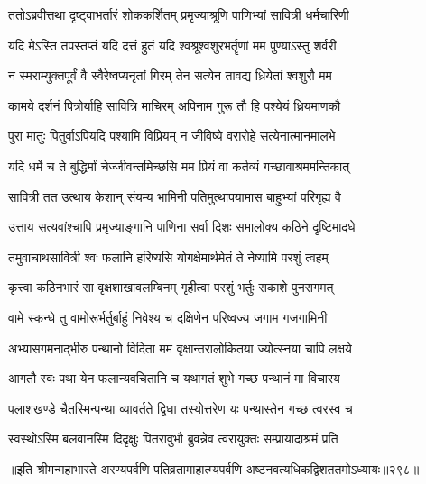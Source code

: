 \begin{center}
\twolineshloka
{ततोऽब्रवीत्तथा दृष्ट्वाभर्तारं शोककर्शितम्}
{प्रमृज्याश्रूणि पाणिभ्यां सावित्री धर्मचारिणी}


\twolineshloka
{यदि मेऽस्ति तपस्तप्तं यदि दत्तं हुतं यदि}
{श्वश्रूश्वशुरभर्तॄणां मम पुण्याऽस्तु शर्वरी}


\twolineshloka
{न स्मराम्युक्तपूर्वं वै स्वैरेष्वप्यनृतां गिरम्}
{तेन सत्येन तावद्य ध्रियेतां श्वशुरौ मम}




\twolineshloka
{कामये दर्शनं पित्रोर्याहि सावित्रि माचिरम्}
{अपिनाम गुरू तौ हि  पश्येयं ध्रियमाणकौ}


\twolineshloka
{पुरा मातुः पितुर्वाऽपियदि पश्यामि विप्रियम्}
{न जीविष्ये वरारोहे सत्येनात्मानमालभे}


\twolineshloka
{यदि धर्मे च ते बुद्धिर्मां चेज्जीवन्तमिच्छसि}
{मम प्रियं वा कर्तव्यं गच्छावाश्रममन्तिकात्}




\twolineshloka
{सावित्री तत उत्थाय केशान् संयम्य भामिनी}
{पतिमुत्थापयामास बाहुभ्यां परिगृह्य वै}


\twolineshloka
{उत्ताय सत्यवांश्चापि प्रमृज्याङ्गानि पाणिना}
{सर्वा दिशः समालोक्य कठिने दृष्टिमादधे}


\twolineshloka
{तमुवाचाथसावित्री श्वः फलानि हरिष्यसि}
{योगक्षेमार्थमेतं ते नेष्यामि परशुं त्वहम्}


\twolineshloka
{कृत्त्वा कठिनभारं सा वृक्षशाखावलम्बिनम्}
{गृहीत्वा परशुं भर्तुः सकाशे पुनरागमत्}


\twolineshloka
{वामे स्कन्धे तु वामोरूर्भर्तुर्बाहुं निवेश्य च}
{दक्षिणेन परिष्वज्य जगाम गजगामिनी}




\twolineshloka
{अभ्यासगमनाद्भीरु पन्थानो विदिता मम}
{वृक्षान्तरालोकितया ज्योत्स्नया चापि लक्षये}


\twolineshloka
{आगतौ स्वः पथा येन फलान्यवचितानि च}
{यथागतं शुभे गच्छ पन्थानं मा विचारय}


\twolineshloka
{पलाशखण्डे चैतस्मिन्पन्था व्यावर्तते द्विधा}
{तस्योत्तरेण यः पन्थास्तेन गच्छ त्वरस्व च}


\twolineshloka
{स्वस्थोऽस्मि बलवानस्मि दिदृक्षुः पितरावुभौ}
{ब्रुवन्नेव त्वरायुक्तः सम्प्रायादाश्रमं प्रति}


॥इति श्रीमन्महाभारते अरण्यपर्वणि
पतिव्रतामाहात्म्यपर्वणि अष्टनवत्यधिकद्विशततमोऽध्यायः॥२९८॥




\end{center}
